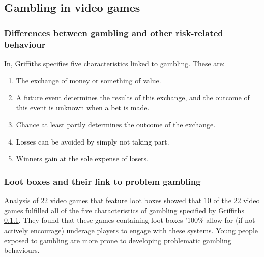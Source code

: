 \documentclass[10pt,oneside,english,a4paper]{article}
\begin{document}
\subsection{Gambling in video games} 

\subsubsection{Differences between gambling and other risk-related behaviour} \label{sec:griffiths}

In\cite{gambling:characteristics}, Griffiths specifies five characteristics linked to gambling. These are:

\begin{enumerate}

\item The exchange of money or something of value.
\item A future event determines the results of this exchange, and the outcome of this event is unknown when a bet is made.
\item Chance at least partly determines the outcome of the exchange.
\item Losses can be avoided by simply not taking part.
\item Winners gain at the sole expense of losers.

\end{enumerate}
	


\subsubsection{Loot boxes and their link to problem gambling} \label{sec:link}

	Analysis of 22 video games\cite{nature:psycho} that feature loot boxes showed that 10 of the 22 video games fulfilled all of the five characteristics of gambling specified by Griffiths \ref{sec:griffiths}.  They found that these games containing loot boxes  '100\% allow for (if not actively encourage) underage players to engage with these systems. Young people exposed to gambling are more prone to developing problematic gambling behaviours\cite{springer:risks}. \par
\end{document}
